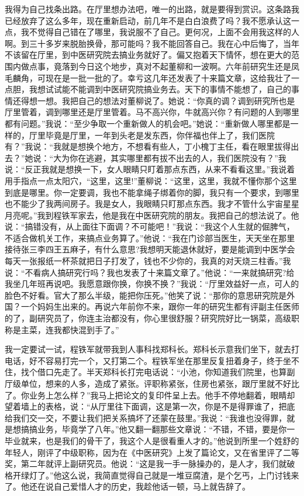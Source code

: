 \documentclass[12pt,oneside]{book}
\begin{document}
我得为自己找条出路。在厅里想办法吧，唯一的出路，就是要得到赏识。这条路我已经放弃了这么多年，现在重新启动，前几年不是白白浪费了吗？我不愿承认这一点，我不觉得自己错在了哪里，我说服不了自己。更何况，上面不会用我这样的人啊。到三十多岁来脱胎换骨，那可能吗？我不能回答自己。我在心中后悔了，当年不该留在厅里，到中医研究院去搞业务就好了。偏又抱着天下情怀，想在更大的范围内做点事，竟落到今日这个地步，真对不起董柳和一波啊。六年前研究生还是凤毛麟角，可现在是一批一批的了。幸亏这几年还发表了十来篇文章，这给我壮了一点胆，我想试试能不能调到中医研究院搞业务去。天下的事情不能想了，自己的事情还得想一想。我把自己的想法对董柳说了。她说：``你真的调？调到研究所也是厅里管着，调到哪里还是厅里管着。马不高兴你，牛就高兴你？有问题的人到哪里都有问题。''我说：``至少争取一个重新做人的机会吧。''她说：``重新做人哪里都是一样的，厅里毕竟是厅里，一年到头老是发东西，你伴福也伴上了，我们医院有？''我说：``我就是想换个地方，不想看有些人，丁小槐丁主任，看在眼里拔得出去？''她说：``大为你在逃避，其实哪里都有拔不出去的人，我们医院没有？''我说：``反正我就是想换一下，女人眼睛只盯着那点东西，从来不看看这里。''我说着用手指点一点太阳穴，``这里，这里!''董柳说：``这里，这里，我就不懂你那个这里到底是哪里。你一定要调，我也不能拿绳子绑着你的脚，我只有一个要求，到哪里也不能少了我两间房子。我是女人，我眼睛只盯那点东西。我才不管什么宇宙星星月亮呢。''我到程铁军家去，他是我在中医研究院的朋友。我把自己的想法说了。他说：``搞错没有，从上面往下面调？不可能吧！''我说：``我这个人生就的倔脾气，不适合做机关工作，来搞点业务算了。''他说：``我在门诊部当医生，天天坐在那里接待张三李四王五麻子，有什么意思?我想明天能退休就好，要是能调到中医学会每天一张报纸一杯茶就把日子打发了，钱也不少你的，我真的对天烧三柱香。''我说：``不看病人搞研究行吗？我也发表了十来篇文章了。''他说：``一来就搞研究?给我坐几年班再说吧。我愿意跟你换，你换不换？''我说：``厅里效益好一点，可人的脸色不好看。官大了那么半级，能把你压死。''他笑了说：``那你的意思研究院是外国？一个妈妈生出来的。再说六年前你不来，跟你一年的研究生都有评副主任医师的了，副研究员了，你连主治都没有，你心里很舒服？研究院好比一锅菜，高级职称是主菜，连我都快混到手了。''

我一定要试一试，程铁军就带我到人事科找郑科长。郑科长示意我们坐下，就去打电话，好不容易打完一个，又打第二个。程铁军坐在那里反复扭着身子，终于坐不住，找个借口先走了。半天郑科长打完电话说：``小池，你知道我们院里，也算副厅级单位，想来的人多，造成了紧张。评职称紧张，住房也紧张，跟厅里就不好比了。你业务上怎么样？''我马上把论文的复印件呈上去。他手不停地翻着，眼睛却望着墙上的表格，说：``从厅里往下面调，这是第一次，你是不是得罪谁了，把底给我们交一交，不要让我们把关系搞坏了还蒙在鼓里。''我说：``我谁也没得罪，就是想搞搞业务，毕竟学了八年。''他又翻一翻那些文章说：``不错，不错，要是你一毕业就来，也是我们的骨干了，我这个人是很看重人才的。''他说到所里一个姓舒的年轻人，刚评了中级职称，因为在《中医研究》上发了篇论文，又在省里评了二等奖，第二年就评上副研究员。他说：``这是我一手一脉操办的，是人才，我们就破格开绿灯了。''他这么说，我简直觉得自己就是一堆豆腐渣，是个乞丐，上门讨钱来了。他还在说自己爱惜人才的历史，我趁他话一顿，马上就告辞了。
\end{document}
